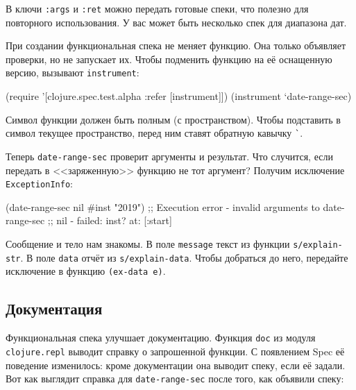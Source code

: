 В ключи \verb|:args| и \verb|:ret| можно передать готовые спеки, что полезно
для повторного использования. У вас может быть несколько спек для диапазона дат.

При создании функциональная спека не меняет функцию. Она только объявляет
проверки, но не запускает их. Чтобы подменить функцию на её оснащенную версию,
вызывают \verb|instrument|:

\begin{english}
  \begin{clojure}
(require '[clojure.spec.test.alpha :refer [instrument]])
(instrument `date-range-sec)
  \end{clojure}
\end{english}


Символ функции должен быть полным (с пространством). Чтобы подставить в символ
текущее пространство, перед ним ставят обратную кавычку \verb|`|.

Теперь \verb|date-range-sec| проверит аргументы и результат. Что случится,
если передать в <<заряженную>> функцию не тот аргумент? Получим исключение
\verb|ExceptionInfo|:

\begin{english}
  \begin{clojure}
(date-range-sec nil #inst "2019")
;; Execution error - invalid arguments to date-range-sec
;; nil - failed: inst? at: [:start]
  \end{clojure}
\end{english}


Сообщение и тело нам знакомы. В поле \verb|message| текст из функции
\verb|s/explain-str|. В поле \verb|data| отчёт из
\verb|s/explain-data|. Чтобы добраться до него, передайте исключение в функцию
\verb|(ex-data e)|.

\subsection{Документация}


Функциональная спека улучшает документацию. Функция \verb|doc| из модуля
\verb|clojure.repl| выводит справку о запрошенной функции. С появлением Spec
её поведение изменилось: кроме документации она выводит спеку, если её
задали. Вот как выглядит справка для \verb|date-range-sec| после того, как
объявили спеку:

